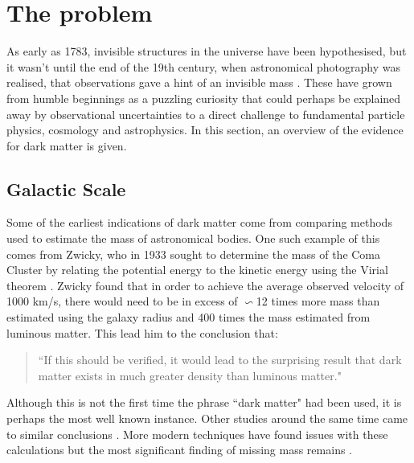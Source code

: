 \section{The problem}

\par
As early as 1783, invisible structures in the universe have been hypothesised, but it wasn't until the end of the 19th century, when astronomical photography was realised, that observations gave a hint of an invisible mass \cite{History_Of_Dark_Matter_2018_ref}.
These have grown from humble beginnings as a puzzling curiosity that could perhaps be explained away by observational uncertainties to a direct challenge to fundamental particle physics, cosmology and astrophysics.
In this section, an overview of the evidence for dark matter is given.

%
%


\subsection{Galactic Scale}

\par
Some of the earliest indications of dark matter come from comparing methods used to estimate the mass of astronomical bodies.
One such example of this comes from Zwicky, who in 1933 sought to determine the mass of the Coma Cluster by relating the potential energy to the kinetic energy using the Virial theorem \cite{Fritz_Zwicky_1933_ref}.
Zwicky found that in order to achieve the average observed velocity of 1000 km/s, there would need to be in excess of $\backsim$12 times more mass than estimated using the galaxy radius and 400 times the mass estimated from luminous matter.
This lead him to the conclusion that:
\begin{quote}
``If this should be verified, it would lead to the surprising result that dark matter
exists in much greater density than luminous matter."
\end{quote}
Although this is not the first time the phrase ``dark matter" had been used, it is perhaps the most well known instance.
Other studies around the same time came to similar conclusions \cite{hubble_and_co_viral_theorem_ref}.
More modern techniques have found issues with these calculations but the most significant finding of missing mass remains \cite{a_second_history_of_dark_matter_ref}.

